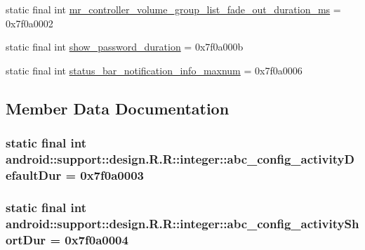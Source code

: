 \begin{CompactItemize}
\item 
static final int \hyperlink{classandroid_1_1support_1_1design_1_1_r_1_1integer_19b1ec40fc5d8923e0cccfbf1adae64b}{mr\_\-controller\_\-volume\_\-group\_\-list\_\-fade\_\-out\_\-duration\_\-ms} = 0x7f0a0002
\item 
static final int \hyperlink{classandroid_1_1support_1_1design_1_1_r_1_1integer_4fb631ebf0ebb12fe276bf352edf28b8}{show\_\-password\_\-duration} = 0x7f0a000b
\item 
static final int \hyperlink{classandroid_1_1support_1_1design_1_1_r_1_1integer_2de627d69de3dfede17661d6a722c76a}{status\_\-bar\_\-notification\_\-info\_\-maxnum} = 0x7f0a0006
\end{CompactItemize}


\subsection{Member Data Documentation}
\hypertarget{classandroid_1_1support_1_1design_1_1_r_1_1integer_4f646b35a3d2dda8de5198b44459dbe3}{
\subsubsection[{abc\_\-config\_\-activityDefaultDur}]{\setlength{\rightskip}{0pt plus 5cm}static final int android::support::design.R.R::integer::abc\_\-config\_\-activityDefaultDur = 0x7f0a0003}}
\label{classandroid_1_1support_1_1design_1_1_r_1_1integer_4f646b35a3d2dda8de5198b44459dbe3}


\hypertarget{classandroid_1_1support_1_1design_1_1_r_1_1integer_2f5425c28deda3c5aceb1e08b0a4be04}{
\subsubsection[{abc\_\-config\_\-activityShortDur}]{\setlength{\rightskip}{0pt plus 5cm}static final int android::support::design.R.R::integer::abc\_\-config\_\-activityShortDur = 0x7f0a0004}}
\label{classandroid_1_1support_1_1design_1_1_r_1_1integer_2f5425c28deda3c5aceb1e08b0a4be04}


